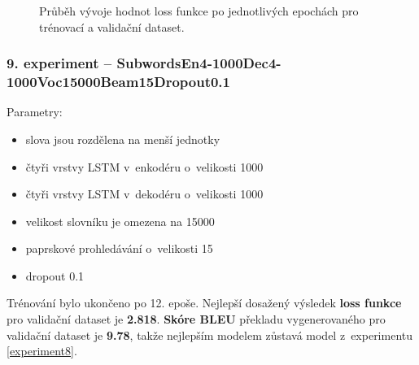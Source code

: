 \begin{figure}[H]
    \begin{center}
    \end{center}
	\caption{Průběh vývoje hodnot loss funkce po jednotlivých epochách pro trénovací a validační dataset.}
\end{figure}

\subsubsection{9. experiment -- SubwordsEn4-1000Dec4-1000Voc15000Beam15Dropout0.1}\label{experiment9}
Parametry:
\begin{itemize}
  \item slova jsou rozdělena na menší jednotky
  \item čtyři vrstvy LSTM v~enkodéru o~velikosti 1000
  \item čtyři vrstvy LSTM v~dekodéru o~velikosti 1000
  \item velikost slovníku je omezena na 15000
  \item paprskové prohledávání o~velikosti 15
  \item dropout 0.1
\end{itemize}

Trénování bylo ukončeno po 12. epoše. Nejlepší dosažený výsledek \textbf{loss funkce} pro validační dataset je \textbf{2.818}. \textbf{Skóre BLEU} překladu vygenerovaného pro validační dataset je \textbf{9.78}, takže nejlepším modelem zůstavá model z~experimentu \ref{experiment8}.

